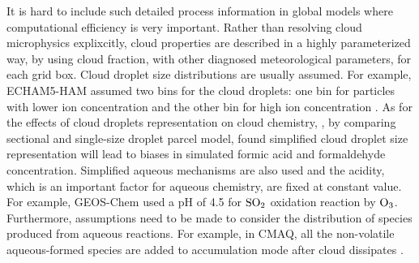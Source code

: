 \documentclass[edeposit,fullpage]{uiucthesis2009}
\newcommand{\jcedits}[1]{{\color{blue} #1}}
\begin{document}
It is hard to include such detailed process information in global
models where computational efficiency is very important. Rather than
resolving cloud microphysics explixcitly, cloud properties are
described in a highly parameterized way, by using cloud fraction, with
other diagnosed meteorological parameters, for each grid box. Cloud
droplet \jcedits{size} distributions are usually assumed. For example,
ECHAM5-HAM assumed two bins for the cloud droplets: one bin for
particles with lower ion concentration and the other bin for high ion
concentration \citep{roelofs2006aerosol}. As for the effects of cloud droplets representation on
cloud chemistry, \citet{barth2006importance}, by comparing sectional
and single-size droplet parcel model, found simplified cloud droplet
size representation will lead to biases in simulated formic acid and
formaldehyde concentration. Simplified aqueous mechanisms are also
used and the acidity, which is an important factor for aqueous
chemistry, are fixed at constant value. For example, GEOS-Chem used a
pH of 4.5 for $\rm SO_2$ oxidation reaction by $\rm
O_3$\citep{park2004natural}. Furthermore, assumptions need to be made
to consider the distribution of species produced from aqueous
reactions. For example, in CMAQ, all the non-volatile aqueous-formed
species are added to accumulation mode after cloud dissipates
\citep{binkowski2003models, fahey2017framework}.
 
\end{document}
